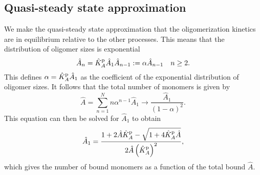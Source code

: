 \documentclass[11pt]{article}
\newcommand{\6}[1]{#1_{\text{6}}}
\newcommand{\3}[1]{#1_{\text{3}}}
\begin{document}
\subsection{Quasi-steady state approximation}
We make the quasi-steady state approximation \cite{lang2022oligomerization} that the oligomerization kinetics are in equilibrium relative to the other processes. This means that the distribution of oligomer sizes is exponential \cite{edelstein1998models,lang2022oligomerization}
\begin{equation}
\label{eq:QSS}
\hat A_n =  \hat{K}^\text{p}_A \hat A_1 \hat A_{n-1}:=\alpha \hat A_{n-1} \quad n \geq 2.
\end{equation}
This defines $\alpha= \hat{K}^\text{p}_A \hat A_1$ as the coefficient of the exponential distribution of oligomer sizes. It follows that the total number of monomers is given by 
\begin{equation}
\hat A = \sum_{n=1}^N n \alpha^{n-1} \hat A_1 \rightarrow \frac{\hat A_1}{\left(1-\alpha\right)^2}.
\end{equation}
This equation can then be solved for $\hat A_1$ to obtain \cite[Eq.~(12)]{lang2022oligomerization}
\begin{equation}
\label{eq:AmonA}
\hat A_1 = \frac{1+2\hat A \hat{K}^\text{p}_A-\sqrt{1+4 \hat{K}^\text{p}_A \hat A}}{2 \hat A \left(\hat{K}^\text{p}_A\right)^2},
\end{equation}
which gives the number of bound monomers as a function of the total bound $\hat A$. 
\end{document}
